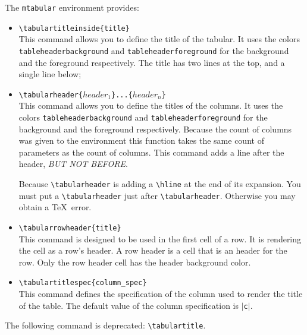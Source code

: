 \documentclass[book,taskpackage,specpackage,codepackage]{upmethodology-document}
\begin{document}
The \texttt{mtabular} environment provides:
\begin{itemize}
\item \texttt{{\textbackslash}tabulartitleinside\{title\}} \\
	This command allows you to define the title of the tabular. It uses the colors \texttt{tableheaderbackground} and \texttt{tableheaderforeground} for the background and the foreground respectively. The title has two lines at the top, and a single line below;

\item \texttt{{\textbackslash}tabularheader\{$header_1$\}...\{$header_n$\}} \\
	This command allows you to define the titles of the columns. It uses the colors \texttt{tableheaderbackground} and \texttt{tableheaderforeground} for the background and the foreground respectively. Because the count of columns was given to the environment this function takes the same count of parameters as the count of columns. This command adds a line after the header, \emph{BUT NOT BEFORE}.
\begin{upmcaution}
	Because \texttt{{\textbackslash}tabularheader} is adding a \texttt{{\textbackslash}hline} at the end of its expansion. You must put a \texttt{{\textbackslash}tabularheader} just after \texttt{{\textbackslash}tabularheader}. Otherwise you may obtain a \TeX\ error.
\end{upmcaution}

\item \texttt{{\textbackslash}tabularrowheader\{title\}} \\
	This command is designed to be used in the first cell of a row. It is rendering the cell as a row's header. A row header is a cell that is an header for the row. Only the row header cell has the header background color.

\item \texttt{{\textbackslash}tabulartitlespec\{column\_spec\}} \\
	This command defines the specification of the column used to render the title of the table.
	The default value of the column specification is $|$\texttt{c}$|$.

\end{itemize}

\begin{upmcaution}
	The following command is deprecated: \texttt{{\textbackslash}tabulartitle}.
\end{upmcaution}
\end{document}

